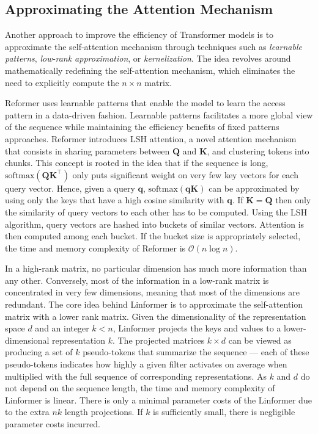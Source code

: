 \subsection{Approximating the Attention Mechanism}

Another approach to improve the efficiency of Transformer models is to approximate the self-attention mechanism through techniques such as \textit{learnable patterns}, \textit{low-rank approximation}, or \textit{kernelization}. The idea revolves around mathematically redefining the self-attention mechanism, which eliminates the need to explicitly compute the $n \times n$ matrix.

Reformer \citep{kitaev2020reformer} uses learnable patterns that enable the model to learn the access pattern in a data-driven fashion. Learnable patterns facilitates a more global view of the sequence while maintaining the efficiency benefits of fixed patterns approaches. Reformer introduces \ac{LSH} attention, a novel attention mechanism that consists in sharing parameters between $\bm{Q}$ and $\bm{K}$, and clustering tokens into chunks. This concept is rooted in the idea that if the sequence is long, $\text{softmax}(\bm{Q}\bm{K}^{\top})$ only puts significant weight on very few key vectors for each query vector. Hence, given a query $\bm{q}$, $\text{softmax}(\bm{qK})$ can be approximated by using only the keys that have a high cosine similarity with $\bm{q}$. If $\bm{K} = \bm{Q}$ then only the similarity of query vectors to each other has to be computed. Using the \ac{LSH} algorithm, query vectors are hashed into buckets of similar vectors. Attention is then computed among each bucket. If the bucket size is appropriately selected, the time and memory complexity of Reformer is $\mathcal{O}(n \log n)$. 

In a high-rank matrix, no particular dimension has much more information than any other. Conversely, most of the information in a low-rank matrix is concentrated in very few dimensions, meaning that most of the dimensions are redundant. The core idea behind Linformer \citep{wang2020linformer} is to approximate the self-attention matrix with a lower rank matrix. Given the dimensionality of the representation space $d$ and an integer $k < n$, Linformer projects the keys and values to a lower-dimensional representation $k$. The projected matrices $k \times d$ can be viewed as producing a set of $k$ pseudo-tokens that summarize the sequence — each of these pseudo-tokens indicates how highly a given filter activates on average when multiplied with the full sequence of corresponding representations. As $k$ and $d$ do not depend on the sequence length, the time and memory complexity of Linformer is linear. There is only a minimal parameter costs of the Linformer due to the extra $nk$ length projections. If $k$ is sufficiently small, there is negligible parameter costs incurred. 


